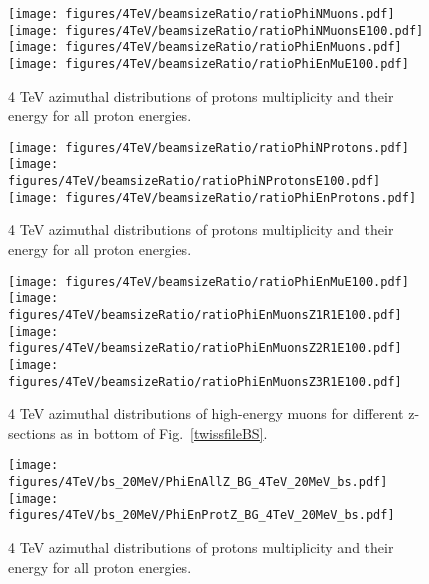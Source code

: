 \begin{figure}[!htb]
\begin{center}
  \texttt{[image: figures/4TeV/beamsizeRatio/ratioPhiNMuons.pdf]}
  \texttt{[image: figures/4TeV/beamsizeRatio/ratioPhiNMuonsE100.pdf]}
  \texttt{[image: figures/4TeV/beamsizeRatio/ratioPhiEnMuons.pdf]}
  \texttt{[image: figures/4TeV/beamsizeRatio/ratioPhiEnMuE100.pdf]}

\end{center}
\vspace{-0.6cm}
 \caption{4 TeV azimuthal distributions of protons multiplicity and their energy for all proton energies.
  \label{bsRatioPhiNPr}}
\end{figure}

\begin{figure}[!htb]
\begin{center}

  \texttt{[image: figures/4TeV/beamsizeRatio/ratioPhiNProtons.pdf]}
  \texttt{[image: figures/4TeV/beamsizeRatio/ratioPhiNProtonsE100.pdf]}
  \texttt{[image: figures/4TeV/beamsizeRatio/ratioPhiEnProtons.pdf]}
\end{center}
\vspace{-0.6cm}
 \caption{4 TeV azimuthal distributions of protons multiplicity and their energy for all proton energies.
  \label{bsRatioPhiNPr}}
\end{figure}

\begin{figure}[!htb]
\begin{center}
  \texttt{[image: figures/4TeV/beamsizeRatio/ratioPhiEnMuE100.pdf]}
  \texttt{[image: figures/4TeV/beamsizeRatio/ratioPhiEnMuonsZ1R1E100.pdf]}
  \texttt{[image: figures/4TeV/beamsizeRatio/ratioPhiEnMuonsZ2R1E100.pdf]}
  \texttt{[image: figures/4TeV/beamsizeRatio/ratioPhiEnMuonsZ3R1E100.pdf]}
\end{center}
\vspace{-0.6cm}
 \caption{4 TeV azimuthal distributions of high-energy muons for different z-sections as in bottom of Fig.~\ref{twissfileBS}.
  \label{bsRatioPhiEnMu}}
\end{figure}

\begin{figure}[!htb]
\begin{center}
  \texttt{[image: figures/4TeV/bs\_20MeV/PhiEnAllZ\_BG\_4TeV\_20MeV\_bs.pdf]}
  \texttt{[image: figures/4TeV/bs\_20MeV/PhiEnProtZ\_BG\_4TeV\_20MeV\_bs.pdf]}
\end{center}
\vspace{-0.6cm}
 \caption{4 TeV azimuthal distributions of protons multiplicity and their energy for all proton energies.
  \label{bsZ}}
\end{figure}

